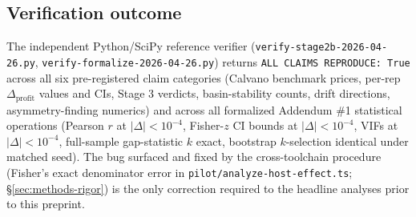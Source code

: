 \subsection{Verification outcome}
\label{sec:results-verification}

The independent Python/SciPy reference verifier (\texttt{verify-stage2b-2026-04-26.py}, \texttt{verify-formalize-2026-04-26.py}) returns \texttt{ALL CLAIMS REPRODUCE: True} across all six pre-registered claim categories (Calvano benchmark prices, per-rep $\Delta_{\text{profit}}$ values and CIs, Stage 3 verdicts, basin-stability counts, drift directions, asymmetry-finding numerics) and across all formalized Addendum \#1 statistical operations (Pearson $r$ at $|\Delta| < 10^{-4}$, Fisher-$z$ CI bounds at $|\Delta| < 10^{-4}$, VIFs at $|\Delta| < 10^{-4}$, full-sample gap-statistic $k$ exact, bootstrap $k$-selection identical under matched seed). The bug surfaced and fixed by the cross-toolchain procedure (Fisher's exact denominator error in \texttt{pilot/analyze-host-effect.ts}; \S\ref{sec:methods-rigor}) is the only correction required to the headline analyses prior to this preprint.

